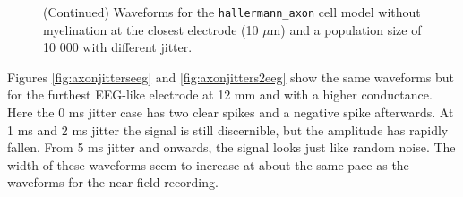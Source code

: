 \documentclass[final, a4paper,masters,en,listoffigures,listoftables,norwegiandates]{NMBU}
\begin{document}
\begin{figure}[htbp]
    \centering
    \vspace*{-3cm}
    \caption{(Continued) Waveforms for the \texttt{hallermann\_axon} cell model without myelination at the closest electrode (10 $\mu$m) and a population size of 10 000 with different jitter.}  
    \label{fig:axonjitters2}
\end{figure}

Figures \ref{fig:axonjitterseeg} and \ref{fig:axonjitters2eeg} show the same waveforms but for the furthest EEG-like electrode at 12 mm and with a higher conductance. Here the 0 ms jitter case has two clear spikes and a negative spike afterwards. At 1 ms and 2 ms jitter the signal is still discernible, but the amplitude has rapidly fallen. From 5 ms jitter and onwards, the signal looks just like random noise. The width of these waveforms seem to increase at about the same pace as the waveforms for the near field recording. 
\end{document}
